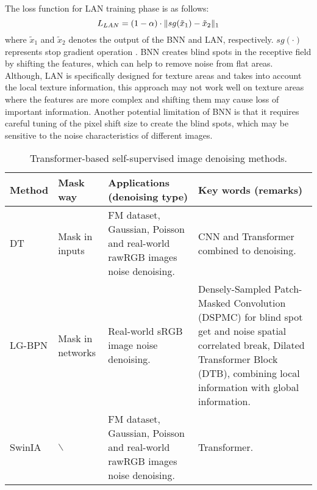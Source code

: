 \documentclass[conference]{IEEEtran}
\begin{document}
The loss function for LAN training phase is as follows:
\begin{equation}
	\setlength{\abovedisplayskip}{0pt}
	\setlength{\belowdisplayskip}{0pt}
	L_{LAN} = (1-\alpha)\cdot \Vert sg(\tilde{x}_1) - \tilde{x}_2 \Vert_1
	\label{eq:Li_4}
\end{equation}
where $\tilde{x}_1$ and $\tilde{x}_2$ denotes the output of the BNN and LAN, respectively. $sg(\cdot)$ represents stop gradient operation \cite{chen2021exploring}.
BNN creates blind spots in the receptive field by shifting the features, which can help to remove noise from flat areas. Although, LAN is specifically designed for texture areas and takes into account the local texture information, this approach may not work well on texture areas where the features are more complex and shifting them may cause loss of important information. Another potential limitation of BNN is that it requires careful tuning of the pixel shift size to create the blind spots, which may be sensitive to the noise characteristics of different images.

\begin{table*}[t]
	\setlength{\abovecaptionskip}{0cm}
	\setlength{\belowcaptionskip}{0cm}
	\caption{Transformer-based self-supervised image denoising methods.}
	\centering
	\begin{tabular}{|m{2.2cm}<{\raggedright}|m{2cm}<{\raggedright}|m{4cm}<{\raggedright}|m{7.5cm}<{\raggedright}|}
		\hline
		Method&	Mask way	&Applications (denoising type)	&Key words (remarks)\\
		\hline
		DT \cite{zhang2023self} &	Mask in inputs	&FM dataset, Gaussian, Poisson and real-world rawRGB images noise denoising.&	CNN and Transformer combined to denoising.\\
		\hline
		LG-BPN \cite{wang2023lg}	&Mask in networks&	Real-world sRGB image noise denoising.&	Densely-Sampled Patch-Masked Convolution (DSPMC) for blind spot get and noise spatial correlated break, Dilated Transformer Block (DTB), combining local information with global information. \\
		\hline
		SwinIA \cite{papkov2023swinia} & $\backslash$ &	FM dataset, Gaussian, Poisson and real-world rawRGB images noise denoising.&	Transformer. \\
		\hline
	\end{tabular}
	\setlength{\belowcaptionskip}{-0.5cm}
	\label{tab:transformer}
\vspace{-2em}
\end{table*}
\end{document}
